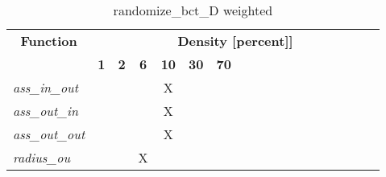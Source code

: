 \begin{table}[h] \centering \begin{tabular}{|l|c|c|c|c|c|c|} \hline\multicolumn{1}{|c|}{\textbf{\large{Function}}} & \multicolumn{17}{c|}{\large{\textbf{Density [percent]]}}}\\\cline{2-18}  & \textbf{1} &  \textbf{2} &  \textbf{6} &  \textbf{10} &  \textbf{30} &  \textbf{70} \\ \hline   \textit{ass\_in\_out} &   &   &   & X &   &   \\ \hline  \textit{ass\_out\_in} &   &   &   & X &   &   \\ \hline  \textit{ass\_out\_out} &   &   &   & X &   &   \\ \hline  \textit{radius\_ou} &   &   & X &   &   &   \\ \hline \end{tabular}\caption{randomize\_bct\_D weighted}\label{tab:my_label} \end{table}